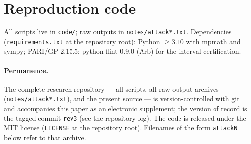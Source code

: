 \documentclass[preprint,12pt]{elsarticle}
\theoremstyle{definition}
\theoremstyle{remark}
\begin{document}
\section{Reproduction code}
\label{app:code}

All scripts live in \texttt{code/}; raw outputs in
\texttt{notes/attack*.txt}. Dependencies (\texttt{requirements.txt} at the
repository root): Python $\ge3.10$ with mpmath and
sympy; PARI/GP 2.15.5; python-flint 0.9.0 (Arb) for the interval certification.

\paragraph{Permanence.}
The complete research repository --- all scripts, all raw output archives
(\texttt{notes/attack*.txt}), and the present source --- is version-controlled
with git and accompanies this paper as an electronic supplement; the version
of record is the tagged commit \texttt{rev3} (see the repository log). The
code is released under the MIT license (\texttt{LICENSE} at the repository
root). Filenames of the form
\texttt{attackN} below refer to that archive.
\end{document}
